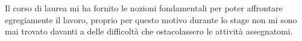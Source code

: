 
Il corso di laurea mi ha fornito le nozioni fondamentali per poter affrontare egregiamente il lavoro, proprio per questo motivo durante lo stage non mi sono mai trovato davanti a delle difficoltà che ostacolassero le attività assegnatomi.
